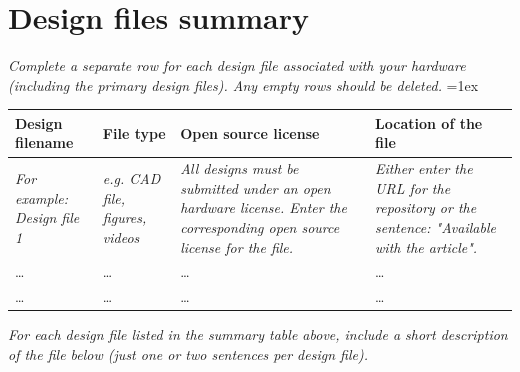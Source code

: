 \documentclass[11pt, letterpaper]{article}
\begin{document}
\section{Design files summary}
\textit{Complete a separate row for each design file associated with your hardware (including the primary design files). Any empty rows should be deleted.}
\vskip 0.1cm
\tabulinesep=1ex
\begin{tabu} to \linewidth {|X|X|X[1.5,1]|X[1.5,1]|} 
\hline
\textbf{Design filename} & \textbf{File type} & \textbf{Open source license} & \textbf{Location of the file} \\\hline
\textit{For example: Design file 1} & \textit{e.g. CAD file, figures, videos} & \textit{All designs must be submitted under an open hardware license. Enter the corresponding open source license for the file.} & \textit{Either enter the URL for the repository or the sentence: "Available with the article".}  \\\hline
\dots & \dots & \dots & \dots \\\hline
\dots & \dots & \dots & \dots \\\hline
\end{tabu}


\vskip 0.3cm
\noindent
\textit{For each design file listed in the summary table above, include a short description of the file below (just one or two sentences per design file).}


\end{document}

